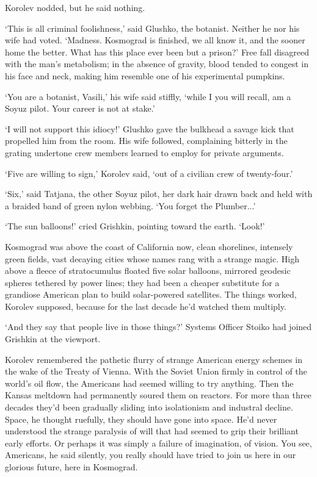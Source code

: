 Korolev nodded, but he said nothing.

`This is all criminal foolishness,' said Glushko, the botanist. Neither he nor his wife had voted. `Madness. Kosmograd is finished, we all know it, and the sooner home the better. What has this place ever been but a prison?' Free fall disagreed with the man's metabolism; in the absence of gravity, blood tended to congest in his face and neck, making him resemble one of his experimental pumpkins.

`You are a botanist, Vasili,' his wife said stiffly, `while I you will recall, am a Soyuz pilot. Your career is not at stake.'

`I will not support this idiocy!' Glushko gave the bulkhead a savage kick that propelled him from the room. His wife followed, complaining bitterly in the grating undertone crew members learned to employ for private arguments.

`Five are willing to sign,' Korolev said, `out of a civilian crew of twenty-four.'

`Six,' said Tatjana, the other Soyuz pilot, her dark hair drawn back and held with a braided band of green nylon webbing. `You forget the Plumber...'

`The sun balloons!' cried Grishkin, pointing toward the earth. `Look!'

Kosmograd was above the coast of California now, clean shorelines, intensely green fields, vast decaying cities whose names rang with a strange magic. High above a fleece of stratocumulus floated five solar balloons, mirrored geodesic spheres tethered by power lines; they had been a cheaper substitute for a grandiose American plan to build solar-powered satellites. The things worked, Korolev supposed, because for the last decade he'd watched them multiply.

`And they say that people live in those things?' Systems Officer Stoiko had joined Grishkin at the viewport.

Korolev remembered the pathetic flurry of strange American energy schemes in the wake of the Treaty of Vienna. With the Soviet Union firmly in control of the world's oil flow, the Americans had seemed willing to try anything. Then the Kansas meltdown had permanently soured them on reactors. For more than three decades they'd been gradually sliding into isolationism and industral decline. Space, he thought ruefully, they should have gone into space. He'd never understood the strange paralysis of will that had seemed to grip their brilliant early efforts. Or perhaps it was simply a failure of imagination, of vision. You see, Americans, he said silently, you really should have tried to join us here in our glorious future, here in Kosmograd.

